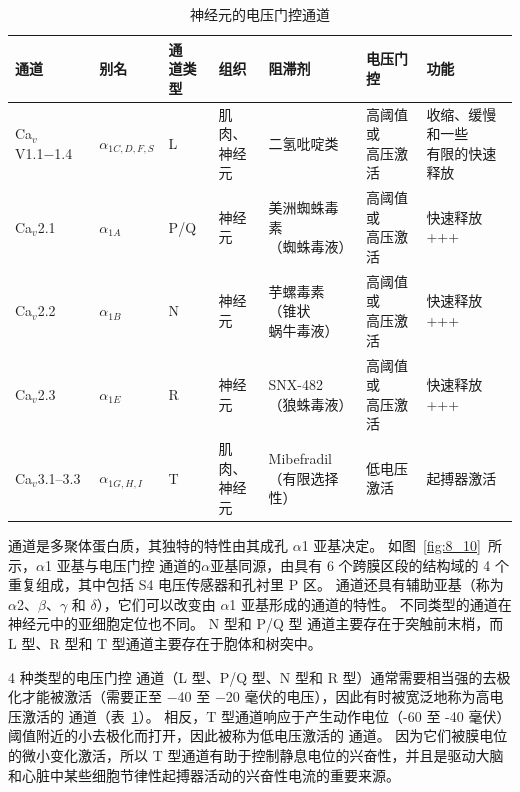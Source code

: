 \begin{table}[htbp]
	\caption{神经元的电压门控通道} \label{tab:15_1} \centering
	\begin{tabular}{lllllll}
		\toprule
		通道 & 别名 & \makecell[l]{\ce{Ca^2+}通\\道类型}  & 组织 & 阻滞剂 & 电压门控 & 功能\\
		\midrule
		Ca$_v$V1.1−1.4 & $\alpha_{1C,D,F,S}$ & L & \makecell[l]{肌肉、\\神经元} & 二氢吡啶类 & \makecell[l]{高阈值或\\高压激活} & \makecell[l]{收缩、缓慢和一些\\有限的快速释放} \\
		Ca$_v$2.1 & $\alpha_{1A}$ & P/Q & 神经元 & \makecell[l]{美洲蜘蛛毒素\\（蜘蛛毒液）} & \makecell[l]{高阈值或\\高压激活} & 快速释放 +++ \\
		Ca$_v$2.2 & $\alpha_{1B}$ & N & 神经元 & \makecell[l]{芋螺毒素（锥状\\蜗牛毒液）} & \makecell{高阈值或\\高压激活} & 快速释放+++ \\
		Ca$_v$2.3 & $\alpha_{1E}$ & R & 神经元 & \makecell[l]{SNX-482\\（狼蛛毒液）} & \makecell[l]{高阈值或\\高压激活} & 快速释放 +++ \\
		Ca$_v$3.1–3.3 & $\alpha_{1G,H,I}$ & T & \makecell[l]{肌肉、\\神经元} & \makecell[l]{Mibefradil\\（有限选择性）} & 低电压激活 & 起搏器激活 \\
		\bottomrule
	\end{tabular}
\end{table}


通道是多聚体蛋白质，其独特的特性由其成孔 $\alpha$1 亚基决定。
如图~\ref{fig:8_10}~所示，$\alpha$1 亚基与电压门控  通道的$\alpha$亚基同源，由具有 6 个跨膜区段的结构域的 4 个重复组成，其中包括 S4 电压传感器和孔衬里 P 区。
通道还具有辅助亚基（称为 $\alpha$2、$\beta$、$\gamma$ 和 $\delta$），它们可以改变由 $\alpha$1 亚基形成的通道的特性。
不同类型的通道在神经元中的亚细胞定位也不同。
N 型和 P/Q 型  通道主要存在于突触前末梢，而 L 型、R 型和 T 型通道主要存在于胞体和树突中。


4 种类型的电压门控  通道（L 型、P/Q 型、N 型和 R 型）通常需要相当强的去极化才能被激活（需要正至 −40 至 −20 毫伏的电压），因此有时被宽泛地称为高电压激活的  通道（表~\ref{tab:15_1}）。
相反，T 型通道响应于产生动作电位（-60 至 -40 毫伏）阈值附近的小去极化而打开，因此被称为低电压激活的  通道。
因为它们被膜电位的微小变化激活，所以 T 型通道有助于控制静息电位的兴奋性，并且是驱动大脑和心脏中某些细胞节律性起搏器活动的兴奋性电流的重要来源。


